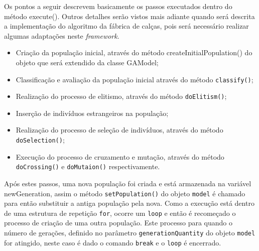 \begin{itemize}
	\par Os pontos a seguir descrevem basicamente os passos executados dentro do
	método execute(). Outros detalhes serão vistos mais adiante quando será
	descrita a implementação do algoritmo da fábrica de calças, pois será
	necessário realizar algumas adaptações neste \textit{framework}.
	
	\begin{itemize}
		\item	Criação da população inicial, através do método createInitialPopulation()
		do objeto que será extendido da classe GAModel;
		
		\item Classificação e avaliação da população inicial através do método
		\texttt{classify()};
		
		\item Realização do processo de elitismo, através do método
		\texttt{doElitism()};
		
		\item Inserção de indivíduos estrangeiros na população;
		
		\item Realização do processo de seleção de indivíduos, através do método
		\texttt{doSelection()};
		
		\item Execução do processo de cruzamento e mutação, através do método
		\texttt{doCrossing()} e \texttt{doMutaion()} respectivamente.
		
		
	\end{itemize}
	
	\par Após estes passos, uma nova população foi criada e está
	armazenada na variável newGeneration, assim o método
	\texttt{setPopulation()} do objeto \texttt{model} é chamado para então substituir
	a antiga população pela nova. Como a execução está dentro de uma estrutura de repetição
	\texttt{for}, ocorre um \texttt{loop} e então é recomeçado o processo de
	criação de uma outra população. Este processo para quando o número de gerações, 
	definido no parâmetro \texttt{generationQuantity} do objeto \texttt{model}
	for atingido, neste caso é dado o comando \texttt{break} e o \texttt{loop} é encerrado.
	

\end{itemize}
